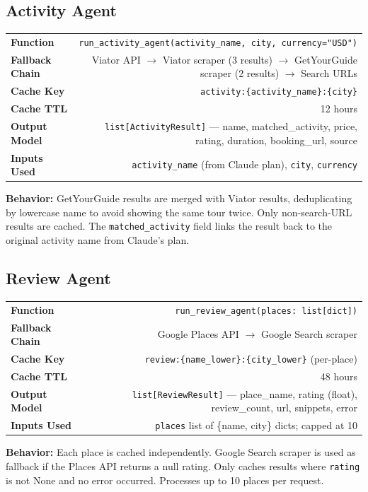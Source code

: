 \documentclass[11pt,a4paper]{article}
\begin{document}
\subsection{Activity Agent}
\begin{infobox}
{\small
\begin{tabularx}{\textwidth}{@{}L{3cm}R@{}}
\textbf{Function}     & \texttt{run\_activity\_agent(activity\_name, city, currency="USD")} \\[3pt]
\textbf{Fallback Chain} & Viator API $\to$ Viator scraper (3 results) $\to$ GetYourGuide scraper (2 results) $\to$ Search URLs \\[3pt]
\textbf{Cache Key}     & \texttt{activity:\{activity\_name\}:\{city\}} \\[3pt]
\textbf{Cache TTL}     & 12 hours \\[3pt]
\textbf{Output Model}  & \texttt{list[ActivityResult]} --- name, matched\_activity, price, rating, duration, booking\_url, source \\[3pt]
\textbf{Inputs Used}   & \texttt{activity\_name} (from Claude plan), \texttt{city}, \texttt{currency} \\
\end{tabularx}}

\textbf{Behavior:} GetYourGuide results are merged with Viator results, deduplicating by lowercase name to avoid showing the same tour twice. Only non-search-URL results are cached. The \texttt{matched\_activity} field links the result back to the original activity name from Claude's plan.
\end{infobox}

\subsection{Review Agent}
\begin{infobox}
{\small
\begin{tabularx}{\textwidth}{@{}L{3cm}R@{}}
\textbf{Function}     & \texttt{run\_review\_agent(places: list[dict])} \\[3pt]
\textbf{Fallback Chain} & Google Places API $\to$ Google Search scraper \\[3pt]
\textbf{Cache Key}     & \texttt{review:\{name\_lower\}:\{city\_lower\}} (per-place) \\[3pt]
\textbf{Cache TTL}     & 48 hours \\[3pt]
\textbf{Output Model}  & \texttt{list[ReviewResult]} --- place\_name, rating (float), review\_count, url, snippets, error \\[3pt]
\textbf{Inputs Used}   & \texttt{places} list of \{name, city\} dicts; capped at 10 \\
\end{tabularx}}

\textbf{Behavior:} Each place is cached independently. Google Search scraper is used as fallback if the Places API returns a null rating. Only caches results where \texttt{rating} is not None and no error occurred. Processes up to 10 places per request.
\end{infobox}
\end{document}
